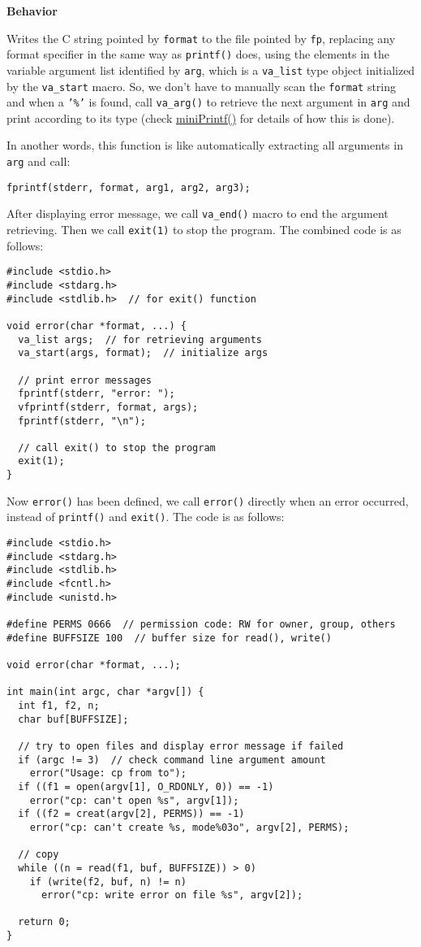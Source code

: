\documentclass[11pt]{article}
\begin{document}
\textbf{Behavior}

Writes the C string pointed by \texttt{format} to the file pointed by \texttt{fp}, replacing any format specifier in the same way as \texttt{printf()} does, using the elements in the variable argument list identified by \texttt{arg}, which is a \texttt{va\_list} type object initialized by the \texttt{va\_start} macro. So, we don't have to manually scan the \texttt{format} string and when a \texttt{'\%'} is found, call \texttt{va\_arg()} to retrieve the next argument in \texttt{arg} and print according to its type (check \hyperref[orgce675b0]{miniPrintf()} for details of how this is done).

In another words, this function is like automatically extracting all arguments in \texttt{arg} and call:
\begin{verbatim}
fprintf(stderr, format, arg1, arg2, arg3);
\end{verbatim}

After displaying error message, we call \texttt{va\_end()} macro to end the argument retrieving. Then we call \texttt{exit(1)} to stop the program. The combined code is as follows:
\begin{verbatim}
#include <stdio.h>
#include <stdarg.h>
#include <stdlib.h>  // for exit() function

void error(char *format, ...) {
  va_list args;  // for retrieving arguments
  va_start(args, format);  // initialize args

  // print error messages
  fprintf(stderr, "error: ");
  vfprintf(stderr, format, args);
  fprintf(stderr, "\n");

  // call exit() to stop the program
  exit(1);
}
\end{verbatim}

Now \texttt{error()} has been defined, we call \texttt{error()} directly when an error occurred, instead of \texttt{printf()} and \texttt{exit()}. The code is as follows:
\begin{verbatim}
#include <stdio.h>
#include <stdarg.h>
#include <stdlib.h>
#include <fcntl.h>
#include <unistd.h>

#define PERMS 0666  // permission code: RW for owner, group, others
#define BUFFSIZE 100  // buffer size for read(), write()

void error(char *format, ...);

int main(int argc, char *argv[]) {
  int f1, f2, n;
  char buf[BUFFSIZE];

  // try to open files and display error message if failed
  if (argc != 3)  // check command line argument amount
    error("Usage: cp from to");
  if ((f1 = open(argv[1], O_RDONLY, 0)) == -1)
    error("cp: can't open %s", argv[1]);
  if ((f2 = creat(argv[2], PERMS)) == -1)
    error("cp: can't create %s, mode%03o", argv[2], PERMS);

  // copy
  while ((n = read(f1, buf, BUFFSIZE)) > 0)
    if (write(f2, buf, n) != n)
      error("cp: write error on file %s", argv[2]);

  return 0;
}
\end{verbatim}
\end{document}
